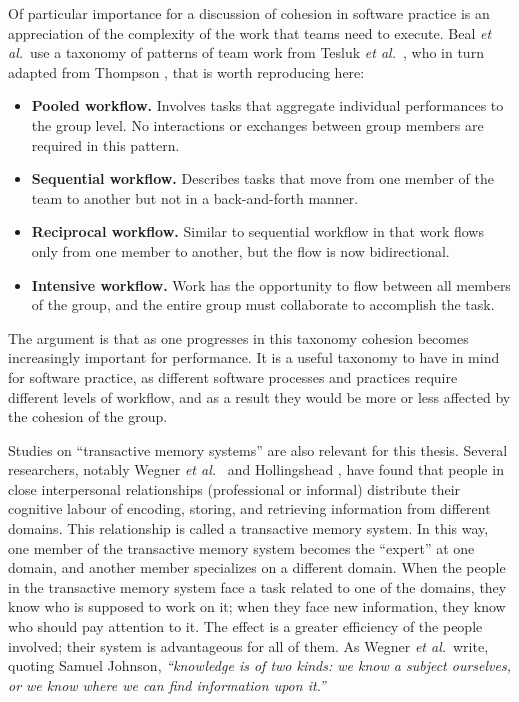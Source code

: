 Of particular importance for a discussion of cohesion in software practice is an appreciation of the complexity of the work that teams need to execute. Beal \emph{et al.}\ use a taxonomy of patterns of team work from Tesluk \emph{et al.}\ , who in turn adapted from Thompson , that is worth reproducing here:

\begin{itemize}
\item \textbf{Pooled workflow.} Involves tasks that aggregate individual performances to the group level. No interactions or exchanges between group members are required in this pattern.

\item \textbf{Sequential workflow.} Describes tasks that move from one member of the team to another but not in a back-and-forth manner.

\item \textbf{Reciprocal workflow.} Similar to sequential workflow in that work flows only from one member to another, but the flow is now bidirectional.

\item \textbf{Intensive workflow.} Work has the opportunity to flow between all members of the group, and the entire group must collaborate to accomplish the task.
\end{itemize}

The argument is that as one progresses in this taxonomy cohesion becomes increasingly important for performance. It is a useful taxonomy to have in mind for software practice, as different software processes and practices require different levels of workflow, and as a result they would be more or less affected by the cohesion of the group.

Studies on ``transactive memory systems'' are also relevant for this thesis. Several researchers, notably Wegner \emph{et al.}\  and Hollingshead , have found that people in close interpersonal relationships (professional or informal) distribute their cognitive labour of encoding, storing, and retrieving information from different domains. This relationship is called a transactive memory system. In this way, one member of the transactive memory system becomes the ``expert'' at one domain, and another member specializes on a different domain. When the people in the transactive memory system face a task related to one of the domains, they know who is supposed to work on it; when they face new information, they know who should pay attention to it. The effect is a greater efficiency of the people involved; their system is advantageous for all of them. As Wegner \emph{et al.}\ write, quoting Samuel Johnson, \emph{``knowledge is of two kinds: we know a subject ourselves, or we know where we can find information upon it.''}


